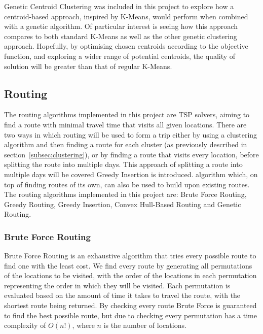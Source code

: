 \noindent
Genetic Centroid Clustering was included in this project to explore how a centroid-based approach, inspired by
K-Means, would perform when combined with a genetic algorithm.
Of particular interest is seeing how this approach compares to both standard K-Means as well as the other genetic
clustering approach.
Hopefully, by optimising chosen centroids according to the objective function, and exploring a wider range of potential
centroids, the quality of solution will be greater than that of regular K-Means.

\subsection{Routing}\label{subsec:routing}
The routing algorithms implemented in this project are TSP solvers, aiming to find a route with minimal travel time
that visits all given locations.
There are two ways in which routing will be used to form a trip either by using a clustering algorithm and then
finding a route for each cluster (as previously described in section~\ref{subsec:clustering}), or by finding a route
that visits every location, before splitting the route into multiple days.
This approach of splitting a route into multiple days will be covered Greedy Insertion is introduced.
algorithm which, on top of finding routes of its own, can also be used to build upon existing routes.
The routing algorithms implemented in this project are: Brute Force Routing, Greedy Routing, Greedy Insertion, Convex
Hull-Based Routing and Genetic Routing.

\subsubsection{Brute Force Routing}\label{subsubsec:brute-force-routing}
Brute Force Routing is an exhaustive algorithm that tries every possible route to find one with the least cost.
We find every route by generating all permutations of the locations to be visited, with the order of the locations
in each permutation representing the order in which they will be visited.
Each permutation is evaluated based on the amount of time it takes to travel the route, with the shortest route being
returned.
By checking every route Brute Force is guaranteed to find the best possible route, but due to checking every permutation
has a time complexity of $O(n!)$, where $n$ is the number of locations.

